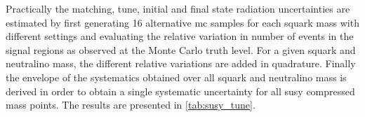 Practically the matching, tune, initial and final state radiation uncertainties
are estimated by first generating 16 alternative \gls{mc} samples for each
squark mass with different settings and evaluating the relative variation in
number of events in the signal regions as observed at the Monte Carlo truth
level. For a given squark and neutralino mass, the different relative variations
are added in quadrature. Finally the envelope of the systematics obtained over
all squark and neutralino mass is derived in order to obtain a single systematic
uncertainty for all \gls{susy} compressed mass points. The results are presented
in \cref{tab:susy_tune}.
\begin{table}[!htb]
  \centering
\caption{Theoretical uncertainty in \% on the \gls{susy} compressed spectra
  signal region acceptance as function of the $\met$ bin in the signal region,
  from tune, matching, initial and final state radiation systematic
  uncertainties. The final value is a common envelope valid for all the
  \gls{susy} compressed models.}
  \label{tab:susy_tune}
\end{table}
